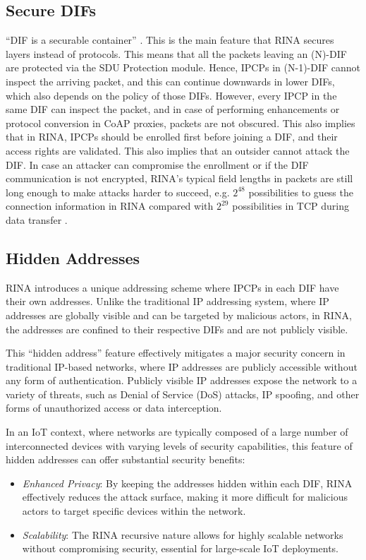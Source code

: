 \documentclass{ieeeaccess}
\begin{document}
\subsection{Secure DIFs}
``DIF is a securable container'' \cite{boddapati2012assessing}. This is the main feature that RINA secures layers instead of protocols. This means that all the packets leaving an (N)-DIF are protected via the SDU Protection module. Hence, IPCPs in (N-1)-DIF cannot inspect the arriving packet, and this can continue downwards in lower DIFs, which also depends on the policy of those DIFs. However, every IPCP in the same DIF can inspect the packet, and in case of performing enhancements or protocol conversion in CoAP proxies, packets are not obscured. This also implies that in RINA, IPCPs should be enrolled first before joining a DIF, and their access rights are validated. This also implies that an outsider cannot attack the DIF. In case an attacker can compromise the enrollment or if the DIF communication is not encrypted, RINA's typical field lengths in packets are still long enough to make attacks harder to succeed, e.g. $2^{48}$ possibilities to guess the connection information in RINA compared with $2^{29}$ possibilities in TCP during data transfer \cite{boddapati2012assessing}.

\subsection{Hidden Addresses}

RINA introduces a unique addressing scheme where IPCPs in each DIF have their own addresses. Unlike the traditional IP addressing system, where IP addresses are globally visible and can be targeted by malicious actors, in RINA, the addresses are confined to their respective DIFs and are not publicly visible.

This ``hidden address'' feature effectively mitigates a major security concern in traditional IP-based networks, where IP addresses are publicly accessible without any form of authentication. Publicly visible IP addresses expose the network to a variety of threats, such as Denial of Service (DoS) attacks, IP spoofing, and other forms of unauthorized access or data interception.

In an IoT context, where networks are typically composed of a large number of interconnected devices with varying levels of security capabilities, this feature of hidden addresses can offer substantial security benefits:

\begin{itemize}
	\item \textit{Enhanced Privacy}: By keeping the addresses hidden within each DIF, RINA effectively reduces the attack surface, making it more difficult for malicious actors to target specific devices within the network.
	\item \textit{Scalability}: The RINA recursive nature allows for highly scalable networks without compromising security, essential for large-scale IoT deployments.
	
\end{itemize}
\end{document}
